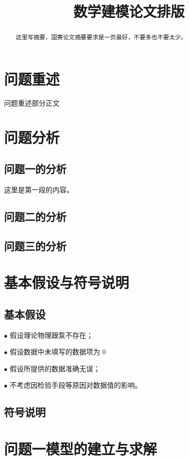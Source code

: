 \documentclass[withoutpreface,bwprint]{cumcmthesis} %
\title{数学建模论文排版}
\begin{document}
\maketitle
\begin{abstract}

	这里写摘要，国赛论文摘要要求是一页最好，不要多也不要太少。

\end{abstract}


\section{问题重述}


问题重述部分正文
\section{问题分析}
\subsection{问题一的分析}
这里是第一段的内容。


\subsection{问题二的分析}

\subsection{问题三的分析}

\section{基本假设与符号说明}
\subsection{基本假设}
$\bullet$ 假设理论物理跟泵不存在；

$\bullet$ 假设数据中未填写的数据项为 0

$\bullet$ 假设所提供的数据准确无误；

$\bullet$ 不考虑因检验手段等原因对数据值的影响。

\subsection{符号说明}


\section{问题一模型的建立与求解}
\end{document}
